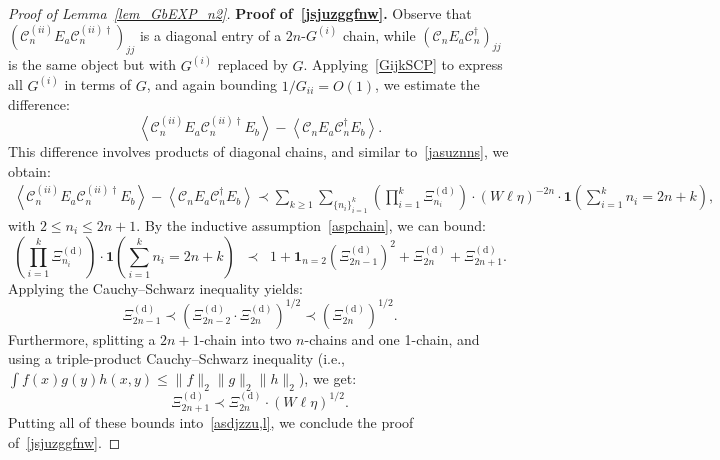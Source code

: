 \documentclass[10pt,reqno]{article}
\theoremstyle{plain} %
\theoremstyle{remark}
\numberwithin{equation}{section}
\begin{document}
\begin{proof}[Proof of Lemma~\ref{lem_GbEXP_n2}]
\bigskip
\noindent
\textbf{Proof of~\eqref{jsjuzggfnw}.} Observe that \( \left( \mathcal{C}^{(ii)}_n E_a \mathcal{C}^{(ii)\dagger}_n \right)_{jj} \) is a diagonal entry of a $2n$-$G^{(i)}$ chain, while \( \left( \mathcal{C}_n E_a \mathcal{C}^\dagger_n \right)_{jj} \) is the same object but with \( G^{(i)} \) replaced by \( G \). Applying~\eqref{GijkSCP} to express all \( G^{(i)} \) in terms of \( G \), and again bounding \( 1/G_{ii} = O(1) \), we estimate the difference:
\[
\left\langle \mathcal{C}^{(ii)}_n E_a \mathcal{C}^{(ii)\dagger}_n E_b \right\rangle - \left\langle \mathcal{C}_n E_a \mathcal{C}^\dagger_n E_b \right\rangle.
\]
This difference involves products of diagonal chains, and similar to~\eqref{jasuznns}, we obtain:
\begin{align}\label{asdjzzu,l}
\left\langle \mathcal{C}^{(ii)}_n E_a \mathcal{C}^{(ii)\dagger}_n E_b \right\rangle 
- \left\langle \mathcal{C}_n E_a \mathcal{C}^\dagger_n E_b \right\rangle 
\prec \sum_{k \ge 1} \sum_{\{n_i\}_{i=1}^k} 
\left( \prod_{i=1}^k \Xi^{(\mathrm{d})}_{n_i} \right) \cdot (W \ell \eta)^{-2n} \cdot \mathbf{1}\left( \sum_{i=1}^k n_i = 2n + k \right),
\end{align}
with \( 2 \le n_i \le 2n + 1 \).
By the inductive assumption~\eqref{aspchain}, we can bound:
\[
\left( \prod_{i=1}^k \Xi^{(\mathrm{d})}_{n_i} \right) \cdot \mathbf{1}\left( \sum_{i=1}^k n_i = 2n + k \right)
\; \;\prec \;\;1 + \mathbf{1}_{n=2} \left( \Xi^{(\mathrm{d})}_{2n-1} \right)^2 + \Xi^{(\mathrm{d})}_{2n} + \Xi^{(\mathrm{d})}_{2n+1}.
\]
Applying the Cauchy–Schwarz inequality yields:
\[
\Xi^{(\mathrm{d})}_{2n - 1} \prec \left( \Xi^{(\mathrm{d})}_{2n - 2} \cdot \Xi^{(\mathrm{d})}_{2n} \right)^{1/2} \prec \left( \Xi^{(\mathrm{d})}_{2n} \right)^{1/2}.
\]
Furthermore, splitting a \( 2n + 1 \)-chain into two \( n \)-chains and one 1-chain, and using a triple-product Cauchy–Schwarz inequality (i.e., \( \int f(x) g(y) h(x,y) \le \|f\|_2 \|g\|_2 \|h\|_2 \)), we get:
\[
\Xi^{(\mathrm{d})}_{2n + 1} \prec \Xi^{(\mathrm{d})}_{2n} \cdot (W \ell \eta)^{1/2}.
\]
Putting all of these bounds into~\eqref{asdjzzu,l}, we conclude the proof of~\eqref{jsjuzggfnw}.



\end{proof}
\end{document}
